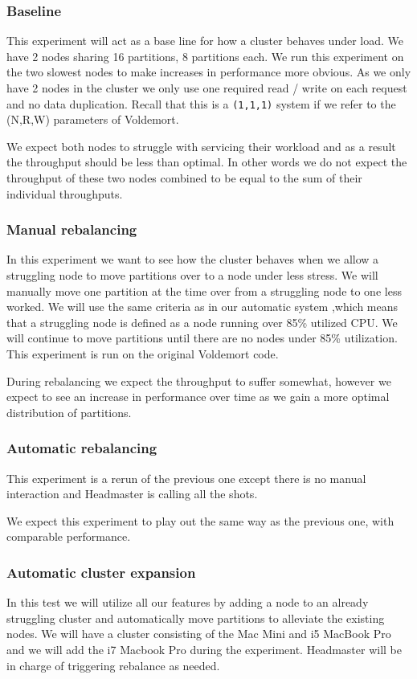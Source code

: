 \subsubsection{Baseline}
This experiment will act as a base line for how a cluster behaves under load. We have 2 nodes sharing 16 partitions, 8 partitions each. We run this experiment on the two slowest nodes to make increases in performance more obvious. As we only have 2 nodes in the cluster we only use one required read / write on each request and no data duplication. Recall that this is a \texttt{(1,1,1)} system if we refer to the (N,R,W) parameters of Voldemort.

We expect both nodes to struggle with servicing their workload and as a result the throughput should be less than optimal. In other words we do not expect the throughput of these two nodes combined to be equal to the sum of their individual throughputs. 

\subsubsection{Manual rebalancing}
In this experiment we want to see how the cluster behaves when we allow a struggling node to move partitions over to a node under less stress. We will manually move one partition at the time over from a struggling node to one less worked. We will use the same criteria as in our automatic system ,which means that a struggling node is defined as a node running over 85\% utilized CPU. We will continue to move partitions until there are no nodes under 85\% utilization. This experiment is run on the original Voldemort code. 

During rebalancing we expect the throughput to suffer somewhat, however we expect to see an increase in performance over time as we gain a more optimal distribution of partitions. 

\subsubsection{Automatic rebalancing}
This experiment is a rerun of the previous one except there is no manual interaction and Headmaster is calling all the shots.

We expect this experiment to play out the same way as the previous one, with comparable performance.

\subsubsection{Automatic cluster expansion}
In this test we will utilize all our features by adding a node to an already struggling cluster and automatically move partitions to alleviate the existing nodes. We will have a cluster consisting of the Mac Mini and i5 MacBook Pro and we will add the i7 Macbook Pro during the experiment. Headmaster will be in charge of triggering rebalance as needed. 

